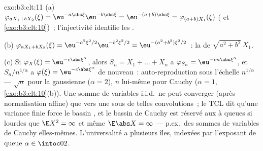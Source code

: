 \begin{solution}{exo:b3:clt:11}
(a) $\varphi_{aX_1 + bX_2}(\xi) =
\eu^{-a\abs\xi}\eu^{-b\abs\xi} = \eu^{-(a+b)\abs\xi} =
\varphi_{(a+b)X_1}(\xi)$ ( et
\cref{exo:b3:clt:10})~; l'injectivité identifie les .

(b) $\varphi_{aX_1+bX_2}(\xi) = \eu^{-a^2\xi^2/2}
\eu^{-b^2\xi^2/2} = \eu^{-(a^2+b^2)\xi^2/2}$~: la  de
$\sqrt{a^2+b^2}\,X_1$.

(c) Si $\varphi_X(\xi) = \eu^{-c\abs\xi^\alpha}$, alors $S_n
= X_1 + \dots + X_n$ a $\varphi_{S_n} =
\eu^{-cn\abs\xi^\alpha}$, et $S_n/n^{1/\alpha}$ a
$\varphi(\xi) = \eu^{-c\abs\xi^\alpha}$ de nouveau~:
auto-reproduction  sous l'échelle $n^{1/\alpha}$ ---
$\sqrt n$ pour la gaussienne ($\alpha = 2$), $n$ lui-même
pour Cauchy ($\alpha = 1$, \cref{exo:b3:clt:10}(b)). Une
somme de variables i.i.d.\ ne peut converger (après
normalisation affine) que vers une   sous de telles
convolutions~; le TCL dit qu'une variance finie force le
bassin , et le bassin de Cauchy est réservé aux 
à queues si lourdes que $\E X^2 = \infty$ et même $\E\abs X
= \infty$ --- p.ex.\ des sommes de variables de Cauchy
elles-mêmes. L'universalité a plusieurs îles, indexées par
l'exposant de queue $\alpha \in \intoc02$.
\end{solution}

